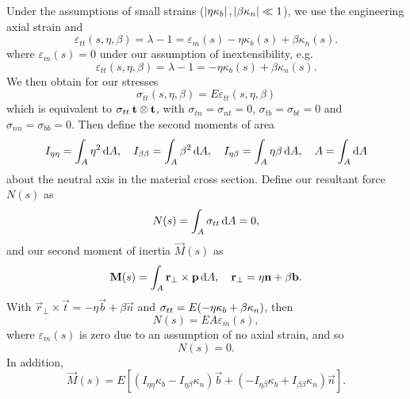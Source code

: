 Under the assumptions of small strains (\(\left| \eta \kappa_b \right|, \left| \beta \kappa_n \right| \ll 1\)), we use the engineering axial strain and
\begin{equation*}
	\varepsilon_{tt}(s,\eta,\beta) = \lambda - 1 = \varepsilon_{m}(s) -\eta \kappa_b(s) + \beta \kappa_n(s).
\end{equation*}
where \(\varepsilon_{m}(s) = 0\) under our assumption of inextensibility, e.g.
\begin{equation} \label{eq:strain-tt}
	\varepsilon_{tt}(s,\eta,\beta) = \lambda - 1 = -\eta \kappa_b(s) + \beta \kappa_n(s).
\end{equation}
We then obtain for our stresses
\begin{equation*}
	\sigma_{tt}(s, \eta, \beta) = E \varepsilon_{tt}(s,\eta,\beta)
\end{equation*}
which is equivalent to \(\mathbf{\sigma}_{tt} \: \mathbf{t} \otimes \mathbf{t}\), with \(\sigma_{tn} = \sigma_{nt} = 0\), \(\sigma_{tb} = \sigma_{bt} = 0\) and \(\sigma_{nn} = \sigma_{bb} = 0\). Then define the second moments of area
\begin{equation*}
	I_{\eta\eta} = \int_A \eta^2 \odif{A}, \quad I_{\beta\beta} = \int_{A} \beta^2 \odif{A}, \quad I_{\eta\beta} = \int_{A} \eta \beta \odif{A}, \quad A = \int_A\odif{A}
\end{equation*}
about the neutral axis in the material cross section. Define our resultant force \(N(s)\) as
\begin{equation*}
	N(s) = \int_A \tens \sigma_{tt} \odif{A} = 0,
\end{equation*}
and our second moment of inertia \(\vec M(s)\) as
\begin{equation*}
	\vec M(s) = \int_A \vec r_{\perp} \times \vec p \odif{A}, \quad \vec r_{\perp} = \eta \vec n + \beta \vec b.
\end{equation*}
With \(\vec r_{\perp} \times \vec t = - \eta \vec b + \beta \vec n\) and \(\mathbf{\sigma}_{tt} = E( - \eta \kappa_b + \beta \kappa_n)\), then
\begin{equation*}
	N(s) = EA\varepsilon_m(s),
\end{equation*}
where \(\varepsilon_m(s)\) is zero due to an assumption of no axial strain, and so
\begin{equation*}
	N(s) = 0.
\end{equation*}
In addition,
\begin{equation*}
	\vec M(s) = E \left[\left(I_{\eta\eta} \kappa_b - I_{\eta\beta} \kappa_n\right) \vec b + \left(-I_{\eta\beta} \kappa_b + I_{\beta\beta}\kappa_{n}\right)\vec n\right].
\end{equation*}
